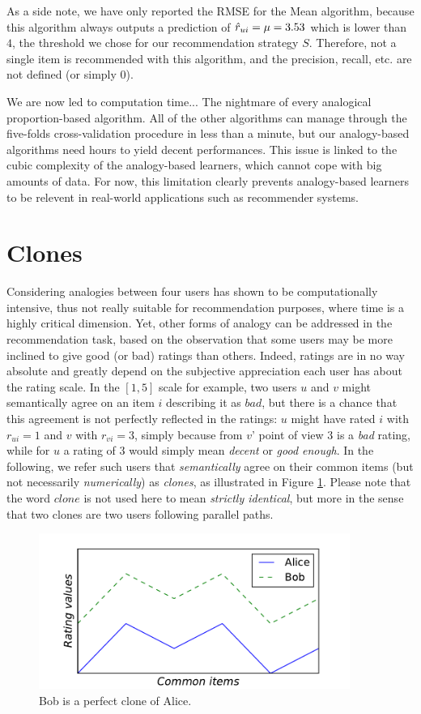 As a side note, we have only reported the RMSE for the Mean algorithm, because
this algorithm always outputs a prediction of $\hat{r}_{ui} = \mu = 3.53$ which is
lower than $4$, the threshold we chose for our recommendation strategy $S$.
Therefore, not a single item is recommended with this algorithm, and the
precision, recall, etc. are not defined (or simply 0).

We are now led to computation time... The nightmare of every analogical
proportion-based algorithm. All of the other algorithms can manage through the
five-folds cross-validation procedure in less than a minute, but our
analogy-based algorithms need hours to yield decent performances. This issue is
linked to the cubic complexity of the analogy-based learners, which cannot cope
with big amounts of data. For now, this limitation clearly prevents
analogy-based learners to be relevent in real-world applications such as
recommender systems.

\section{Clones}

Considering analogies between four users has shown to be computationally
intensive, thus not really suitable for recommendation purposes, where time is
a highly critical dimension. Yet, other forms of analogy can be addressed in
the recommendation task, based on the observation that some users may be more
inclined to give good (or bad) ratings than others. Indeed, ratings are in no
way absolute and greatly depend on the subjective appreciation each user has
about the rating scale. In the $[1, 5]$ scale for example, two users $u$ and
$v$ might semantically agree on an item $i$ describing it as $bad$, but there
is a chance that this agreement is not perfectly reflected in the ratings: $u$
might have rated $i$ with $r_{ui} = 1$ and $v$ with $r_{vi} = 3$, simply
because from $v$' point of view $3$ is a \textit{bad} rating, while for $u$ a
rating of $3$ would simply mean \textit{decent} or \textit{good enough}.  In
the following, we refer such users that \textit{semantically} agree on their
common items (but not necessarily \textit{numerically}) as \textit{clones}, as
illustrated in Figure \ref{FIG:alice_and_bob_clones}. Please note that the word
$clone$ is not used here to mean \textit{strictly identical}, but more in the
sense that two clones are two users following parallel paths.

\begin{figure}[!h]
\centering
\includegraphics[width=4in]{figures/clones.pdf}
\caption{Bob is a perfect clone of Alice.}
\label{FIG:alice_and_bob_clones}
\end{figure}

